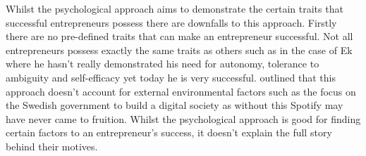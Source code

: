 \par
Whilst the psychological approach aims to demonstrate the certain traits that successful entrepreneurs possess there are downfalls to this approach. Firstly there are no pre-defined traits that can make an entrepreneur successful. Not all entrepreneurs possess exactly the same traits as others such as in the case of Ek where he hasn't really demonstrated his need for autonomy, tolerance to ambiguity and self-efficacy yet today he is very successful. \textcite[][15]{deakins2012} outlined that this approach doesn't account for external environmental factors such as the focus on the Swedish government to build a digital society \parencite{lynskey2013} as without this Spotify may have never came to fruition. Whilst the psychological approach is good for finding certain factors to an entrepreneur's success, it doesn't explain the full story behind their motives. 


